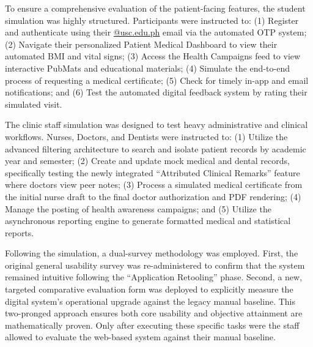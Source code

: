 To ensure a comprehensive evaluation of the patient-facing features, the student simulation was highly structured. Participants were instructed to: (1) Register and authenticate using their \url{@usc.edu.ph} email via the automated OTP system; (2) Navigate their personalized Patient Medical Dashboard to view their automated BMI and vital signs; (3) Access the Health Campaigns feed to view interactive PubMats and educational materials; (4) Simulate the end-to-end process of requesting a medical certificate; (5) Check for timely in-app and email notifications; and (6) Test the automated digital feedback system by rating their simulated visit.

The clinic staff simulation was designed to test heavy administrative and clinical workflows. Nurses, Doctors, and Dentists were instructed to: (1) Utilize the advanced filtering architecture to search and isolate patient records by academic year and semester; (2) Create and update mock medical and dental records, specifically testing the newly integrated ``Attributed Clinical Remarks'' feature where doctors view peer notes; (3) Process a simulated medical certificate from the initial nurse draft to the final doctor authorization and PDF rendering; (4) Manage the posting of health awareness campaigns; and (5) Utilize the asynchronous reporting engine to generate formatted medical and statistical reports. 

Following the simulation, a dual-survey methodology was employed. First, the original general usability survey was re-administered to confirm that the system remained intuitive following the ``Application Retooling'' phase. Second, a new, targeted comparative evaluation form was deployed to explicitly measure the digital system's operational upgrade against the legacy manual baseline. This two-pronged approach ensures both core usability and objective attainment are mathematically proven. Only after executing these specific tasks were the staff allowed to evaluate the web-based system against their manual baseline.

